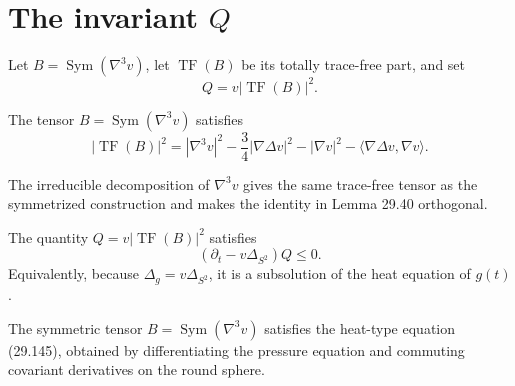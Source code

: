 \section{\texorpdfstring{The invariant \(Q\)}{The invariant Q}}

Let \(B=\operatorname{Sym}(\nabla^3v)\), let
\(\operatorname{TF}(B)\) be its totally trace-free part, and set
\[
 Q=v|\operatorname{TF}(B)|^2.
\]

\begin{lemma}
\label{lem:chow-iv-trace-free-third-derivative}

The tensor \(B=\operatorname{Sym}(\nabla^3v)\) satisfies
\[
 |\operatorname{TF}(B)|^2=|\nabla^3v|^2-\frac34|\nabla\Delta v|^2
 -|\nabla v|^2-\langle\nabla\Delta v,\nabla v\rangle.
\]
\end{lemma}

\begin{remark}
\label{rem:chow-iv-third-derivative-decomposition}

The irreducible decomposition of \(\nabla^3v\) gives the same trace-free
tensor as the symmetrized construction and makes the identity in Lemma 29.40
orthogonal.
\end{remark}

\begin{proposition}
\label{prop:chow-iv-q-heat-subsolution}


The quantity \(Q=v|\operatorname{TF}(B)|^2\) satisfies
\[
 (\partial_t-v\Delta_{S^2})Q\le0.
\]
Equivalently, because \(\Delta_g=v\Delta_{S^2}\), it is a subsolution of
the heat equation of \(g(t)\).
\end{proposition}

\begin{lemma}
\label{lem:chow-iv-symmetrized-third-derivative-evolution}

The symmetric tensor \(B=\operatorname{Sym}(\nabla^3v)\) satisfies the
heat-type equation (29.145), obtained by differentiating the pressure
equation and commuting covariant derivatives on the round sphere.
\end{lemma}

